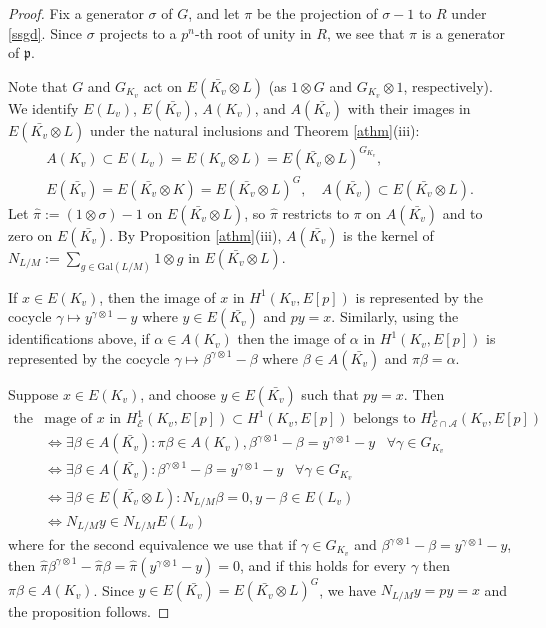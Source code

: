 \documentclass[reqno]{amsart}
\theoremstyle{definition}
\def\A{\mathcal{A}}
\def\E{\mathcal{E}}
\def\P{\mathfrak{p}}
\def\Gal{\mathrm{Gal}}
\def\Hs#1{H^1_{#1}}
\def\HE{\Hs{\E}}
\begin{document}
\begin{proof}
Fix a generator $\sigma$ of $G$, and let $\pi$ be the projection of $\sigma-1$ 
to $R$ under \eqref{ssgd}.  Since $\sigma$ projects to a $p^n$-th root of 
unity in $R$, we see that $\pi$ is a generator of $\P$.

Note that $G$ and $G_{K_v}$ act on $E(\bar{K_v} \otimes L)$ (as 
$1 \otimes G$ and $G_{K_v} \otimes 1$, respectively).  
We identify $E(L_v)$, $E(\bar{K_v})$, $A(K_v)$, and $A(\bar{K_v})$ 
with their images in $E(\bar{K_v} \otimes L)$ under the natural inclusions 
and Theorem \ref{athm}(iii):
\begin{gather*}
A(K_v) \subset E(L_v) = E(K_v \otimes L) = E(\bar{K_v} \otimes L)^{G_{K_v}}, \\
E(\bar{K_v}) = E(\bar{K_v} \otimes K) = E(\bar{K_v} \otimes L)^G, 
    \quad A(\bar{K_v}) \subset E(\bar{K_v} \otimes L).
\end{gather*}
Let $\hat\pi := (1 \otimes\sigma)-1$ on $E(\bar{K_v} \otimes L)$, 
so $\hat\pi$ restricts to $\pi$ on $A(\bar{K_v})$ and to zero on $E(\bar{K_v})$.
By Proposition \ref{athm}(iii), $A(\bar{K_v})$ is the kernel of 
$N_{L/M} := \sum_{g \in \Gal(L/M)} 1 \otimes g$ in $E(\bar{K_v} \otimes L)$.

If $x \in E(K_v)$, then the image of $x$ in $H^1(K_v,E[p])$ is represented 
by the cocycle $\gamma \mapsto y^{\gamma \otimes 1} - y$ where $y \in E(\bar{K_v})$ 
and $py = x$.  Similarly, using the identifications above, 
if $\alpha \in A(K_v)$ then the image of 
$\alpha$ in $H^1(K_v,E[p])$ is represented 
by the cocycle $\gamma \mapsto \beta^{\gamma \otimes 1} - \beta$ where 
$\beta \in A(\bar{K_v})$ and $\pi\beta = \alpha$.

Suppose $x \in E(K_v)$, and choose $y \in E(\bar{K_v})$ such that $py = x$.  Then 
\begin{align*}
\text{the i}&\text{mage of $x$ in $\HE(K_v,E[p]) \subset H^1(K_v,E[p])$ 
    belongs to $\Hs{\E\cap\A}(K_v,E[p])$} \\
&\iff \exists \beta \in A(\bar{K_v}): \pi\beta \in A(K_v), 
    \beta^{\gamma \otimes 1} - \beta = y^{\gamma \otimes 1} - y  \;\;\;\forall \gamma \in G_{K_v}\\
&\iff \exists \beta \in A(\bar{K_v}):  
    \beta^{\gamma \otimes 1} - \beta = y^{\gamma \otimes 1} - y  \;\;\;\forall \gamma \in G_{K_v}\\
&\iff \exists \beta \in E(\bar{K_v} \otimes L): N_{L/M}\beta=0,
    y-\beta \in E(L_v) \\
&\iff N_{L/M} y \in N_{L/M}E(L_v)
\end{align*}
where for the second equivalence we use that if $\gamma \in G_{K_v}$ 
and $\beta^{\gamma \otimes 1} - \beta = y^{\gamma \otimes 1} - y$, 
then $\hat\pi\beta^{\gamma \otimes 1} - \hat\pi\beta = \hat\pi(y^{\gamma \otimes 1}-y) = 0$, 
and if this holds for every $\gamma$ then $\pi\beta \in A(K_v)$.
Since $y \in E(\bar{K_v}) = E(\bar{K_v} \otimes L)^G$, we have 
$N_{L/M}y = py = x$ and the proposition follows.
\end{proof}
\end{document}
